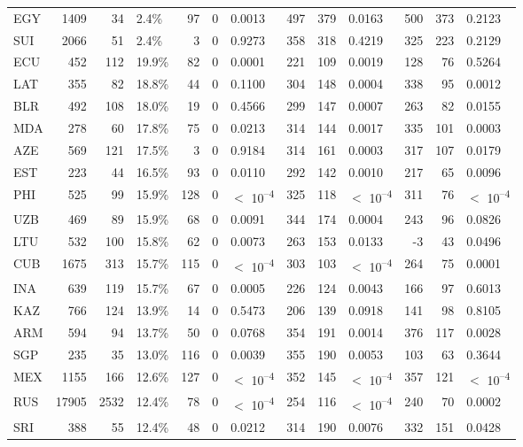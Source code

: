 \begin{tabular}[t]{lrrlrrlrrlrrl}
EGY & 1409 & 34 & 2.4\% & 97 & 0 & 0.0013 & 497 & 379 & 0.0163 & 500 & 373 & 0.2123\\
SUI & 2066 & 51 & 2.4\% & 3 & 0 & 0.9273 & 358 & 318 & 0.4219 & 325 & 223 & 0.2129\\
ECU & 452 & 112 & 19.9\% & 82 & 0 & 0.0001 & 221 & 109 & 0.0019 & 128 & 76 & 0.5264\\
LAT & 355 & 82 & 18.8\% & 44 & 0 & 0.1100 & 304 & 148 & 0.0004 & 338 & 95 & 0.0012\\
BLR & 492 & 108 & 18.0\% & 19 & 0 & 0.4566 & 299 & 147 & 0.0007 & 263 & 82 & 0.0155\\
MDA & 278 & 60 & 17.8\% & 75 & 0 & 0.0213 & 314 & 144 & 0.0017 & 335 & 101 & 0.0003\\
AZE & 569 & 121 & 17.5\% & 3 & 0 & 0.9184 & 314 & 161 & 0.0003 & 317 & 107 & 0.0179\\
EST & 223 & 44 & 16.5\% & 93 & 0 & 0.0110 & 292 & 142 & 0.0010 & 217 & 65 & 0.0096\\
PHI & 525 & 99 & 15.9\% & 128 & 0 & $<$ 10\textsuperscript{--4} & 325 & 118 & $<$ 10\textsuperscript{--4} & 311 & 76 & $<$ 10\textsuperscript{--4}\\
UZB & 469 & 89 & 15.9\% & 68 & 0 & 0.0091 & 344 & 174 & 0.0004 & 243 & 96 & 0.0826\\
LTU & 532 & 100 & 15.8\% & 62 & 0 & 0.0073 & 263 & 153 & 0.0133 & -3 & 43 & 0.0496\\
CUB & 1675 & 313 & 15.7\% & 115 & 0 & $<$ 10\textsuperscript{--4} & 303 & 103 & $<$ 10\textsuperscript{--4} & 264 & 75 & 0.0001\\
INA & 639 & 119 & 15.7\% & 67 & 0 & 0.0005 & 226 & 124 & 0.0043 & 166 & 97 & 0.6013\\
KAZ & 766 & 124 & 13.9\% & 14 & 0 & 0.5473 & 206 & 139 & 0.0918 & 141 & 98 & 0.8105\\
ARM & 594 & 94 & 13.7\% & 50 & 0 & 0.0768 & 354 & 191 & 0.0014 & 376 & 117 & 0.0028\\
SGP & 235 & 35 & 13.0\% & 116 & 0 & 0.0039 & 355 & 190 & 0.0053 & 103 & 63 & 0.3644\\
MEX & 1155 & 166 & 12.6\% & 127 & 0 & $<$ 10\textsuperscript{--4} & 352 & 145 & $<$ 10\textsuperscript{--4} & 357 & 121 & $<$ 10\textsuperscript{--4}\\
RUS & 17905 & 2532 & 12.4\% & 78 & 0 & $<$ 10\textsuperscript{--4} & 254 & 116 & $<$ 10\textsuperscript{--4} & 240 & 70 & 0.0002\\
SRI & 388 & 55 & 12.4\% & 48 & 0 & 0.0212 & 314 & 190 & 0.0076 & 332 & 151 & 0.0428\\

\end{tabular}
